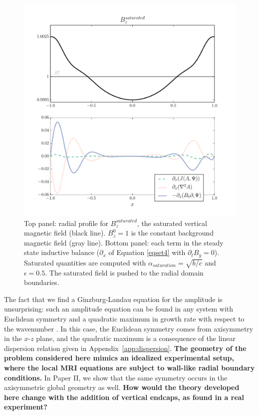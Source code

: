 \documentclass{emulateapj}
\begin{document}
\begin{figure}
\centering
\includegraphics[width=\columnwidth]{thingap_saturation_mechanism_plots_Bfield_slice60.pdf}
\caption{Top panel: radial profile for $B_z^{saturated}$, the saturated vertical magnetic field (black line). $B_z^0 = 1$ is the constant background magnetic field (gray line). Bottom panel: each term in the steady state inductive balance ($\partial_x$ of Equation \ref{eqset4} with $\partial_t B_y = 0$). Saturated quantities are computed with $\alpha_{saturation} = \sqrt{b/c}$ and $\epsilon = 0.5$. The saturated field is pushed to the radial domain boundaries.}\label{fig:sat_comp_Bfield}
\end{figure}

The fact that we find a Ginzburg-Landau equation for the amplitude is unsurprising: such an amplitude equation can be found in any system with Euclidean symmetry and a quadratic maximum in growth rate with respect to the wavenumber \citep{Hoyle:2006}. In this case, the Euclidean symmetry comes from axisymmetry in the $x$-$z$ plane, and the quadratic maximum is a consequence of the linear dispersion relation given in Appendix~\ref{app:dispersion}. \textbf{The geometry of the problem considered here mimics an idealized experimental setup, where the local MRI equations are subject to wall-like radial boundary conditions.} In Paper II, we show that the same symmetry occurs in the axisymmetric global geometry as well. \textbf{How would the theory developed here change with the addition of vertical endcaps, as found in a real experiment?}%
\end{document}
